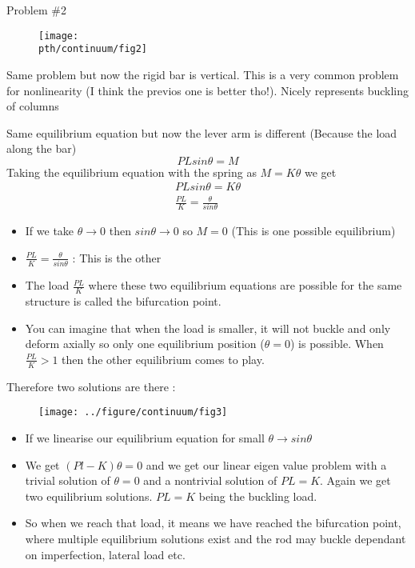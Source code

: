 	\begin{frame}{Problem \#2}
		\begin{figure}
			\centering
			\texttt{[image: \\pth/continuum/fig2]}
			\caption{}
			\label{fig:fig1}
		\end{figure}
		Same problem but now the rigid bar is vertical. This is a very common problem for nonlinearity (I think the previos one is better tho!). Nicely represents buckling of columns
	\end{frame}

	\begin{frame}
		Same equilibrium equation but now the lever arm is different (Because the load along the bar)
		\begin{equation}
		PL sin \theta = M
		\end{equation}
		Taking the equilibrium equation with the spring as $ M = K \theta$ we get
		\begin{align*}
		PL sin \theta = K \theta \\
		\frac{PL}{K} = \frac{\theta}{sin \theta}
		\end{align*}
		\begin{itemize}
			\item If we take $\theta \rightarrow 0$ then $sin \theta \rightarrow 0$ so $M = 0$ (This is one possible equilibrium)
			\item	$\frac{PL}{K} = \frac{\theta}{sin \theta}$ : This is the other
			\item The load $\frac{PL}{K}$ where these two equilibrium equations are possible for the same structure is called the bifurcation point. 
			\item You can imagine that when the load is smaller, it will not buckle and only deform axially so only one equilibrium position ($\theta =0$) is possible. When $\frac{PL}{K}>1$ then the other equilibrium comes to play.
		\end{itemize}
	\end{frame}

	\begin{frame}
		Therefore two solutions  are there :
		\begin{figure}
			\centering
			\texttt{[image: ../figure/continuum/fig3]}
			\label{fig:fig3}
		\end{figure}
		\begin{itemize}
			\item If we linearise our equilibrium equation for small $\theta \rightarrow sin \theta$
			\item We get $(Pl - K)\theta = 0$ and we get our linear eigen value problem with a trivial solution of $\theta = 0$ and a nontrivial solution of $PL = K$. Again we get two equilibrium solutions. $PL = K$ being the buckling load. 
			\item So when we reach that load, it means we have reached the bifurcation point, where multiple equilibrium solutions exist and the rod may buckle dependant on imperfection, lateral load etc. 			
		\end{itemize}
	\end{frame}


